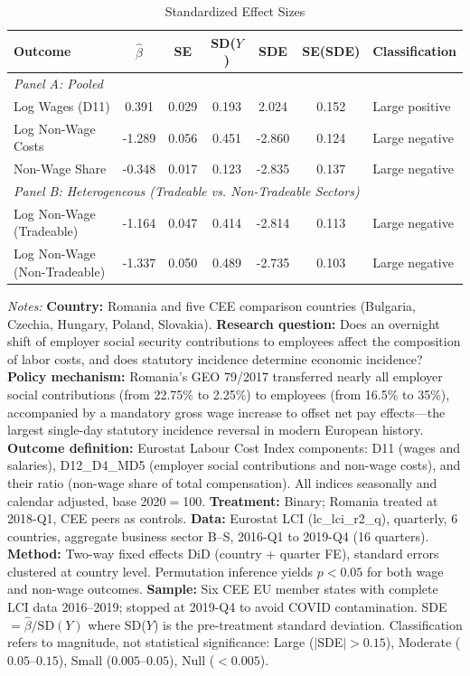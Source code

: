 \begin{table}[htbp]
\centering
\small
\begin{threeparttable}
\caption{Standardized Effect Sizes}
\label{tab:sde}
\begin{tabular}{lcccccp{2.5cm}}
\toprule
Outcome & $\hat{\beta}$ & SE & SD($Y$) & SDE & SE(SDE) & Classification \\
\midrule
\multicolumn{7}{l}{\textit{Panel A: Pooled}} \\[3pt]
Log Wages (D11) & 0.391 & 0.029 & 0.193 & 2.024 & 0.152 & Large positive \\
Log Non-Wage Costs & -1.289 & 0.056 & 0.451 & -2.860 & 0.124 & Large negative \\
Non-Wage Share & -0.348 & 0.017 & 0.123 & -2.835 & 0.137 & Large negative \\
\midrule
\multicolumn{7}{l}{\textit{Panel B: Heterogeneous (Tradeable vs. Non-Tradeable Sectors)}} \\[3pt]
Log Non-Wage (Tradeable) & -1.164 & 0.047 & 0.414 & -2.814 & 0.113 & Large negative \\
Log Non-Wage (Non-Tradeable) & -1.337 & 0.050 & 0.489 & -2.735 & 0.103 & Large negative \\
\bottomrule
\end{tabular}
\end{threeparttable}
\vspace{0.3em}
\parbox{\textwidth}{\footnotesize
\item \textit{Notes:} \textbf{Country:} Romania and five CEE comparison countries (Bulgaria, Czechia, Hungary, Poland, Slovakia). \textbf{Research question:} Does an overnight shift of employer social security contributions to employees affect the composition of labor costs, and does statutory incidence determine economic incidence? \textbf{Policy mechanism:} Romania's GEO 79/2017 transferred nearly all employer social contributions (from 22.75\% to 2.25\%) to employees (from 16.5\% to 35\%), accompanied by a mandatory gross wage increase to offset net pay effects---the largest single-day statutory incidence reversal in modern European history. \textbf{Outcome definition:} Eurostat Labour Cost Index components: D11 (wages and salaries), D12\_D4\_MD5 (employer social contributions and non-wage costs), and their ratio (non-wage share of total compensation). All indices seasonally and calendar adjusted, base 2020$=$100. \textbf{Treatment:} Binary; Romania treated at 2018-Q1, CEE peers as controls. \textbf{Data:} Eurostat LCI (lc\_lci\_r2\_q), quarterly, 6 countries, aggregate business sector B--S, 2016-Q1 to 2019-Q4 (16 quarters). \textbf{Method:} Two-way fixed effects DiD (country + quarter FE), standard errors clustered at country level. Permutation inference yields $p < 0.05$ for both wage and non-wage outcomes. \textbf{Sample:} Six CEE EU member states with complete LCI data 2016--2019; stopped at 2019-Q4 to avoid COVID contamination. SDE $= \hat{\beta} / \text{SD}(Y)$ where SD($Y$) is the pre-treatment standard deviation. Classification refers to magnitude, not statistical significance: Large ($|$SDE$| > 0.15$), Moderate ($0.05$--$0.15$), Small ($0.005$--$0.05$), Null ($< 0.005$).
}
\end{table}
